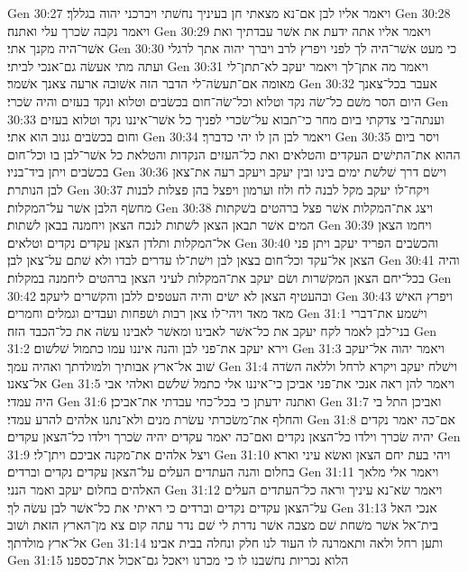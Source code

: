 Gen 30:27  ויאמר אליו לבן אם־נא מצאתי חן בעיניך נחשׁתי ויברכני יהוה בגללך׃
Gen 30:28  ויאמר נקבה שׂכרך עלי ואתנה׃
Gen 30:29  ויאמר אליו אתה ידעת את אשׁר עבדתיך ואת אשׁר־היה מקנך אתי׃
Gen 30:30  כי מעט אשׁר־היה לך לפני ויפרץ לרב ויברך יהוה אתך לרגלי ועתה מתי אעשׂה גם־אנכי לביתי׃
Gen 30:31  ויאמר מה אתן־לך ויאמר יעקב לא־תתן־לי מאומה אם־תעשׂה־לי הדבר הזה אשׁובה ארעה צאנך אשׁמר׃
Gen 30:32  אעבר בכל־צאנך היום הסר משׁם כל־שׂה נקד וטלוא וכל־שׂה־חום בכשׂבים וטלוא ונקד בעזים והיה שׂכרי׃
Gen 30:33  וענתה־בי צדקתי ביום מחר כי־תבוא על־שׂכרי לפניך כל אשׁר־איננו נקד וטלוא בעזים וחום בכשׂבים גנוב הוא אתי׃
Gen 30:34  ויאמר לבן הן לו יהי כדברך׃
Gen 30:35  ויסר ביום ההוא את־התישׁים העקדים והטלאים ואת כל־העזים הנקדות והטלאת כל אשׁר־לבן בו וכל־חום בכשׂבים ויתן ביד־בניו׃
Gen 30:36  וישׂם דרך שׁלשׁת ימים בינו ובין יעקב ויעקב רעה את־צאן לבן הנותרת׃
Gen 30:37  ויקח־לו יעקב מקל לבנה לח ולוז וערמון ויפצל בהן פצלות לבנות מחשׂף הלבן אשׁר על־המקלות׃
Gen 30:38  ויצג את־המקלות אשׁר פצל ברהטים בשׁקתות המים אשׁר תבאן הצאן לשׁתות לנכח הצאן ויחמנה בבאן לשׁתות׃
Gen 30:39  ויחמו הצאן אל־המקלות ותלדן הצאן עקדים נקדים וטלאים׃
Gen 30:40  והכשׂבים הפריד יעקב ויתן פני הצאן אל־עקד וכל־חום בצאן לבן וישׁת־לו עדרים לבדו ולא שׁתם על־צאן לבן׃
Gen 30:41  והיה בכל־יחם הצאן המקשׁרות ושׂם יעקב את־המקלות לעיני הצאן ברהטים ליחמנה במקלות׃
Gen 30:42  ובהעטיף הצאן לא ישׂים והיה העטפים ללבן והקשׁרים ליעקב׃
Gen 30:43  ויפרץ האישׁ מאד מאד ויהי־לו צאן רבות ושׁפחות ועבדים וגמלים וחמרים׃
Gen 31:1  וישׁמע את־דברי בני־לבן לאמר לקח יעקב את כל־אשׁר לאבינו ומאשׁר לאבינו עשׂה את כל־הכבד הזה׃
Gen 31:2  וירא יעקב את־פני לבן והנה איננו עמו כתמול שׁלשׁום׃
Gen 31:3  ויאמר יהוה אל־יעקב שׁוב אל־ארץ אבותיך ולמולדתך ואהיה עמך׃
Gen 31:4  וישׁלח יעקב ויקרא לרחל וללאה השׂדה אל־צאנו׃
Gen 31:5  ויאמר להן ראה אנכי את־פני אביכן כי־איננו אלי כתמל שׁלשׁם ואלהי אבי היה עמדי׃
Gen 31:6  ואתנה ידעתן כי בכל־כחי עבדתי את־אביכן׃
Gen 31:7  ואביכן התל בי והחלף את־משׂכרתי עשׂרת מנים ולא־נתנו אלהים להרע עמדי׃
Gen 31:8  אם־כה יאמר נקדים יהיה שׂכרך וילדו כל־הצאן נקדים ואם־כה יאמר עקדים יהיה שׂכרך וילדו כל־הצאן עקדים׃
Gen 31:9  ויצל אלהים את־מקנה אביכם ויתן־לי׃
Gen 31:10  ויהי בעת יחם הצאן ואשׂא עיני וארא בחלום והנה העתדים העלים על־הצאן עקדים נקדים וברדים׃
Gen 31:11  ויאמר אלי מלאך האלהים בחלום יעקב ואמר הנני׃
Gen 31:12  ויאמר שׂא־נא עיניך וראה כל־העתדים העלים על־הצאן עקדים נקדים וברדים כי ראיתי את כל־אשׁר לבן עשׂה לך׃
Gen 31:13  אנכי האל בית־אל אשׁר משׁחת שׁם מצבה אשׁר נדרת לי שׁם נדר עתה קום צא מן־הארץ הזאת ושׁוב אל־ארץ מולדתך׃
Gen 31:14  ותען רחל ולאה ותאמרנה לו העוד לנו חלק ונחלה בבית אבינו׃
Gen 31:15  הלוא נכריות נחשׁבנו לו כי מכרנו ויאכל גם־אכול את־כספנו׃
